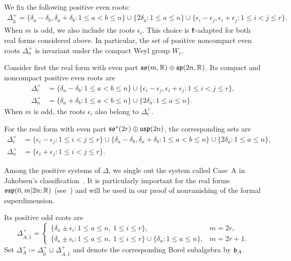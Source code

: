 We fix the following positive even roots:
\begin{equation}
\begin{aligned}
\Delta_{\bar0}^+
=
\{\delta_a-\delta_b,\delta_a+\delta_b:
1\leq a<b\leq n\}\cup
\{2\delta_a:1\leq a\leq n\}\cup
\{\epsilon_i-\epsilon_j,\epsilon_i+\epsilon_j:
1\leq i<j\leq r\}.
\end{aligned}
\label{eq:osp-positive-even-roots}
\end{equation}
When $m$ is odd, we also include the roots
$\epsilon_i$. This choice is ${\mathfrak k}$-adapted for both real forms considered above. In particular, the set of positive noncompact even roots $\Delta_n^+$ is invariant under the compact Weyl group $W_c$.


Consider first the real form with even part
${\mathfrak{so}}(m,{\mathbb R})\oplus{\mathfrak{sp}}(2n,{\mathbb R})$. Its compact
and noncompact positive even roots are
\begin{equation}
\begin{aligned}
\Delta_c^+
&=
\{\delta_a-\delta_b:1\leq a<b\leq n\}\cup
\{\epsilon_i-\epsilon_j,\epsilon_i+\epsilon_j:
1\leq i<j\leq r\},\\
\Delta_n^+
&=
\{\delta_a+\delta_b:1\leq a<b\leq n\}
\cup\{2\delta_a:1\leq a\leq n\}.
\end{aligned}
\end{equation}
When $m$ is odd, the roots $\epsilon_i$ also
belong to $\Delta_c^+$.

For the real form with even part
${\mathfrak{so}}^*(2r)\oplus\mathfrak{usp}(2n)$,
the corresponding sets are
\begin{equation}
\begin{aligned}
\Delta_c^+
&=
\{\epsilon_i-\epsilon_j:1\leq i<j\leq r\}\cup
\{\delta_a-\delta_b,\delta_a+\delta_b:
1\leq a<b\leq n\}\cup
\{2\delta_a:1\leq a\leq n\},\\
\Delta_n^+
&=
\{\epsilon_i+\epsilon_j:1\leq i<j\leq r\}.
\end{aligned}
\end{equation}

Among the positive systems of $\Delta$, we single out the system called Case~A in Jakobsen's classification~\cite{jakobsen1994full}. It is particularly important for the real forms ${\mathfrak{osp}}(0,m\vert 2n;{\mathbb R})$ (see~\cite{Schmidt_unitary_branching}) and will be used in our proof of nonvanishing of the formal superdimension.


Its positive odd roots are
\begin{equation}\label{eq::type_A_plus_1}
\Delta_{A,\bar1}^+
=
\begin{cases}
\{\delta_a\pm\epsilon_i:
1\leq a\leq n,\ 1\leq i\leq r\},
&m=2r,\\
\{\delta_a\pm\epsilon_i:
1\leq a\leq n,\ 1\leq i\leq r\}
\cup\{\delta_a:1\leq a\leq n\},
&m=2r+1.
\end{cases}
\end{equation}
Set
$
\Delta_A^+
\coloneqq
\Delta_{\bar0}^+\sqcup\Delta_{A,\bar1}^+
$
and denote the corresponding Borel subalgebra
by ${\mathfrak b}_A$.

